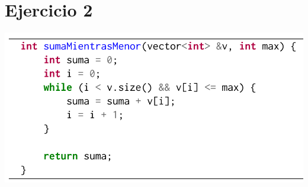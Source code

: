 \documentclass[12 pt]{article}
\begin{document}
\newpage

\section*{Ejercicio 2}
    \begin{center}
        \includegraphics[width=0.7 \linewidth]{img/ej2.png}
    \end{center}
\end{document}
